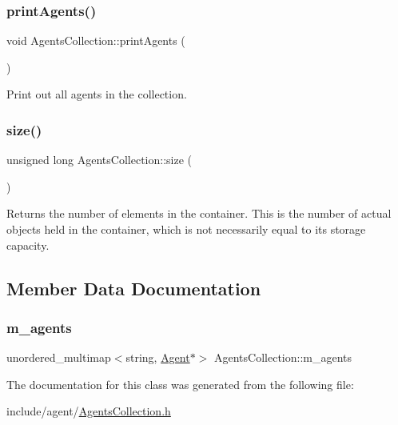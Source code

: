 \subsubsection{\texorpdfstring{print\+Agents()}{printAgents()}}
{\footnotesize\ttfamily void Agents\+Collection\+::print\+Agents (\begin{DoxyParamCaption}{ }\end{DoxyParamCaption})}

Print out all agents in the collection. \mbox{\label{class_agents_collection_a3226f7eb58b11623bdb353d8938f60d3}} 
\subsubsection{\texorpdfstring{size()}{size()}}
{\footnotesize\ttfamily unsigned long Agents\+Collection\+::size (\begin{DoxyParamCaption}{ }\end{DoxyParamCaption})}

\begin{DoxyReturn}{Returns}
the number of elements in the container. This is the number of actual objects held in the container, which is not necessarily equal to its storage capacity. 
\end{DoxyReturn}


\subsection{Member Data Documentation}
\mbox{\label{class_agents_collection_a35a5728b0e0108c2f37897720c904dd1}} 
\subsubsection{\texorpdfstring{m\+\_\+agents}{m\_agents}}
{\footnotesize\ttfamily unordered\+\_\+multimap$<$string, \hyperlink{class_agent}{Agent}$\ast$$>$ Agents\+Collection\+::m\+\_\+agents\hspace{0.3cm}{\ttfamily [private]}}



The documentation for this class was generated from the following file\+:\begin{DoxyCompactItemize}
\item 
include/agent/\hyperlink{_agents_collection_8h}{Agents\+Collection.\+h}\end{DoxyCompactItemize}
